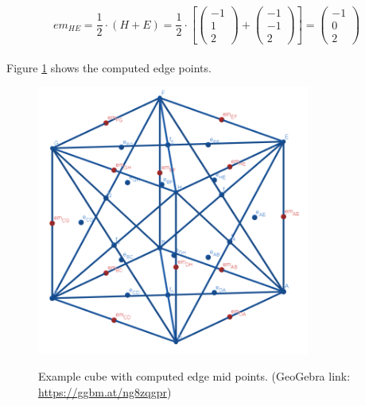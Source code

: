 \documentclass{article}
\begin{document}
\[em_{HE}=\frac{1}{2}\cdot(H+E)=\frac{1}{2}\cdot\left[
\left({\begin{array}{c} -1 \\  1 \\ 2 \end{array}}\right)+
\left({\begin{array}{c} -1 \\  -1 \\ 2 \end{array}}\right)\right]=
\left({\begin{array}{c} -1 \\ 0 \\ 2 \end{array}}\right)
\]
\\
Figure \ref{fig:cube5} shows the computed edge points.
\begin{figure}[H]
\caption{Example cube with computed edge mid points. (GeoGebra link: \href{https://ggbm.at/ng8zqgpr}{https://ggbm.at/ng8zqgpr})}
\centering
\includegraphics[width=0.8\textwidth]{images/cl-05.png}
\label{fig:cube5}
\end{figure}
\end{document}
